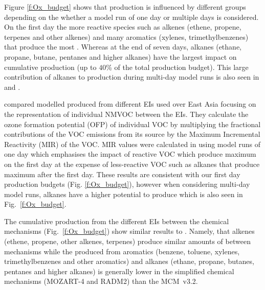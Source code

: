 \documentclass[14pt]{extarticle}
\begin{document}
Figure \ref{f:Ox_budget} shows that  production is influenced by different groups depending on the whether a model run of one day or multiple days is considered.
On the first day the more reactive species such as alkenes (ethene, propene, terpenes and other alkenes) and many aromatics (xylenes, trimethylbenzenes) that produce the most .
Whereas at the end of seven days, alkanes (ethane, propane, butane, pentanes and higher alkanes) have the largest impact on cumulative  production (up to $40$\% of the total  production budget).
This large contribution of alkanes to  production during multi-day model runs is also seen in \citet{Butler:2011} and \citet{Coates:2015}.

\citet{Li:2014} compared modelled  produced from different EIs used over East Asia focusing on the representation of individual NMVOC between the EIs.
They calculate the ozone formation potential (OFP) of individual VOC by multiplying the fractional contributions of the VOC emissions from its source by the Maximum Incremental Reactivity (MIR) of the VOC.
MIR values were calculated in \citet{Carter:1994} using model runs of one day which emphasises the impact of reactive VOC which produce maximum  on the first day at the expense of less-reactive VOC such as alkanes that produce maximum  after the first day.
These results are consistent with our first day  production budgets (Fig. \ref{f:Ox_budget}), however when considering multi-day model runs, alkanes have a higher potential to produce  \citep{Butler:2011, Coates:2015} which is also seen in Fig.~\ref{f:Ox_budget}.

The cumulative  production from the different EIs between the chemical mechanisms (Fig.~\ref{f:Ox_budget}) show similar results to \citet{Coates:2015}.
Namely, that alkenes (ethene, propene, other alkenes, terpenes) produce similar amounts of  between mechanisms while the  produced from aromatics (benzene, toluene, xylenes, trimethylbenzenes and other aromatics) and alkanes (ethane, propane, butanes, pentanes and higher alkanes) is generally lower in the simplified chemical mechanisms (MOZART-4 and RADM2) than the MCM~v3.2.
\end{document}
